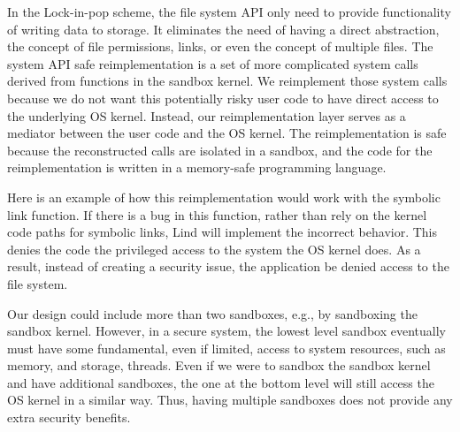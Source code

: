 In the Lock-in-pop scheme, the file system API only need
to provide functionality of writing data to storage. 
It eliminates the need of having a direct abstraction, the
concept of file permissions, links, or even the concept of multiple files.
The system API safe reimplementation is a set of more complicated system calls
derived from functions in the sandbox kernel.
We reimplement those system calls because we do not want this potentially risky user code
to have direct access to the underlying OS kernel.
Instead, our reimplementation layer serves as a mediator between the user code
and the OS kernel. The reimplementation is safe
because the reconstructed calls are isolated in a sandbox, and the code for the
reimplementation is written in a memory-safe programming language.

Here is an example of how this reimplementation would work with the symbolic link function.
If there is a bug in this function, rather than rely on the kernel code paths
for symbolic links, Lind will implement the incorrect behavior. 
This denies the code the privileged access to the system the OS kernel does.
As a result, instead of creating a security issue, the application be denied access
to the file system.

Our design could include more than two sandboxes, e.g., by sandboxing the sandbox
kernel. However, in a secure system,
the lowest level sandbox eventually must have some fundamental,
even if limited, access to system resources, such as memory, and storage, threads.
Even if we were to sandbox the sandbox kernel and have additional sandboxes,
the one at the bottom level will still access the OS kernel in a similar way.
Thus, having multiple sandboxes does not provide any extra security benefits.

%

%

%

